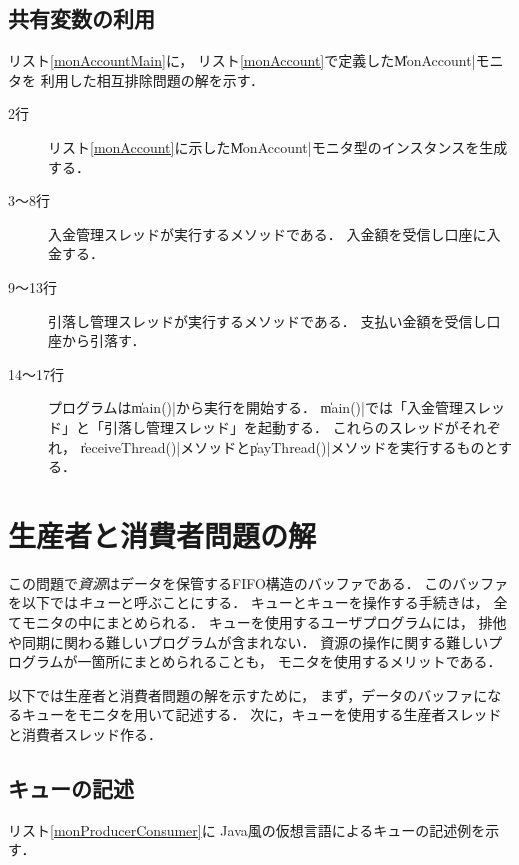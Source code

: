 \subsection{共有変数の利用}
リスト\ref{monAccountMain}に，
リスト\ref{monAccount}で定義した\|MonAccount|モニタを
利用した相互排除問題の解を示す．



\begin{description}
\item [2行]
  リスト\ref{monAccount}に示した\|MonAccount|モニタ型のインスタンスを生成する．
\item [3〜8行]
  入金管理スレッドが実行するメソッドである．
  入金額を受信し口座に入金する．
\item [9〜13行]
  引落し管理スレッドが実行するメソッドである．
  支払い金額を受信し口座から引落す．
\item [14〜17行]
  プログラムは\|main()|から実行を開始する．
  \|main()|では「入金管理スレッド」と「引落し管理スレッド」を起動する．
  これらのスレッドがそれぞれ，
  \|receiveThread()|メソッドと\|payThread()|メソッドを実行するものとする．
\end{description}

\section{生産者と消費者問題の解}
この問題で\emph{資源}はデータを保管するFIFO構造のバッファである．
このバッファを以下では\emph{キュー}と呼ぶことにする．
キューとキューを操作する手続きは，
全てモニタの中にまとめられる．
キューを使用するユーザプログラムには，
排他や同期に関わる難しいプログラムが含まれない．
資源の操作に関する難しいプログラムが一箇所にまとめられることも，
モニタを使用するメリットである．

以下では生産者と消費者問題の解を示すために，
まず，データのバッファになるキューをモニタを用いて記述する．
次に，キューを使用する生産者スレッドと消費者スレッド作る．

\subsection{キューの記述}
リスト\ref{monProducerConsumer}に
Java風の仮想言語によるキューの記述例を示す．



